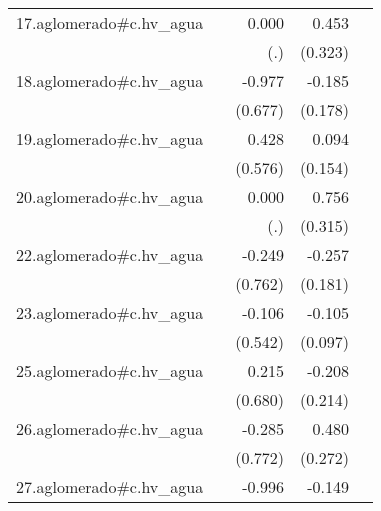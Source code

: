{\begin{longtable}{l*{4}{D{.}{.}{-1}}}
\addlinespace
17.aglomerado#c.hv\_agua&                     &       0.000         &       0.453         &                     \\
            &                     &         (.)         &     (0.323)         &                     \\
\addlinespace
18.aglomerado#c.hv\_agua&                     &      -0.977         &      -0.185         &                     \\
            &                     &     (0.677)         &     (0.178)         &                     \\
\addlinespace
19.aglomerado#c.hv\_agua&                     &       0.428         &       0.094         &                     \\
            &                     &     (0.576)         &     (0.154)         &                     \\
\addlinespace
20.aglomerado#c.hv\_agua&                     &       0.000         &       0.756\sym{*}  &                     \\
            &                     &         (.)         &     (0.315)         &                     \\
\addlinespace
22.aglomerado#c.hv\_agua&                     &      -0.249         &      -0.257         &                     \\
            &                     &     (0.762)         &     (0.181)         &                     \\
\addlinespace
23.aglomerado#c.hv\_agua&                     &      -0.106         &      -0.105         &                     \\
            &                     &     (0.542)         &     (0.097)         &                     \\
\addlinespace
25.aglomerado#c.hv\_agua&                     &       0.215         &      -0.208         &                     \\
            &                     &     (0.680)         &     (0.214)         &                     \\
\addlinespace
26.aglomerado#c.hv\_agua&                     &      -0.285         &       0.480         &                     \\
            &                     &     (0.772)         &     (0.272)         &                     \\
\addlinespace
27.aglomerado#c.hv\_agua&                     &      -0.996         &      -0.149         &                     \\

\end{longtable}}
